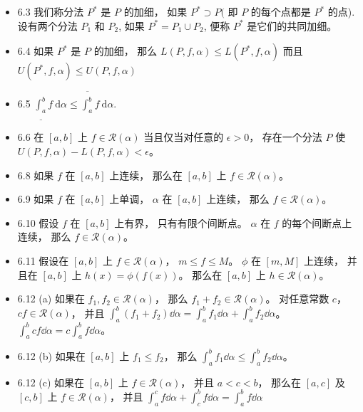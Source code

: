 \begin{itemize}
\item 6.3 我们称分法 $P^{*}$ 是 $P$ 的加细， 如果 $P^{*} \supset P($ 即 $P$ 的每个点都是 $P^{*}$ 的点). 设有两个分法 $P_{1}$ 和 $P_{2}$, 如果 $P^{*}=P_{1} \cup P_{2}$, 便称 $P^{*}$ 是它们的共同加细。

\item 6.4 如果 $P^{*}$ 是 $P$ 的加细， 那么 $L(P, f, \alpha) \leqslant L\left(P^{*}, f, \alpha\right)$ 而且 $U\left(P^{*}, f, \alpha\right) \leqslant U(P, f, \alpha)$

\item 6.5 $\underline{\int_{a}^{b}} f \mathrm{~d} \alpha \leqslant \overline{\int_{a}^{b}} f \mathrm{~d} \alpha .$

\item 6.6 在 $[a,b]$ 上 $f\in\mathscr{R}(\alpha)$ 当且仅当对任意的 $\epsilon>0$， 存在一个分法 $P$ 使 $U(P,f,\alpha)-L(P,f,\alpha)<\epsilon$。

\item 6.8 如果 $f$ 在 $[a,b]$ 上连续， 那么在 $[a,b]$ 上 $f\in \mathscr{R}(\alpha)$。

\item 6.9 如果 $f$ 在 $[a,b]$ 上单调， $\alpha$ 在 $[a,b]$ 上连续， 那么 $f\in \mathscr{R}(\alpha)$。

\item 6.10 假设 $f$ 在 $[a,b]$ 上有界， 只有有限个间断点。 $\alpha$ 在 $f$ 的每个间断点上连续， 那么 $f\in \mathscr{R}(\alpha)$。

\item 6.11 假设在 $[a,b]$ 上 $f\in \mathscr{R}(\alpha)$， $m\leqslant f\leqslant M$。 $\phi$ 在 $[m, M]$ 上连续， 并且在 $[a,b]$ 上 $h(x) = \phi(f(x))$。 那么在 $[a,b]$ 上 $h\in \mathscr{R}(\alpha)$。

\item 6.12 (a) 如果在 $f_1,f_2 \in \mathscr{R}(\alpha)$， 那么 $f_1+f_2 \in \mathscr{R}(\alpha)$。 对任意常数 $c$， $cf\in \mathscr{R}(\alpha)$， 并且 $\int_a^b (f_1+f_2)\dd{\alpha} = \int_a^bf_1\dd{\alpha} + \int_a^bf_2\dd{\alpha}$。 $\int_a^b cf\dd{\alpha} = c\int_a^b f\dd{\alpha}$。

\item  6.12 (b) 如果在 $[a,b]$ 上 $f_1\leqslant f_2$， 那么 $\int_a^bf_1\dd{\alpha} \leqslant \int_a^bf_2\dd{\alpha}$。

\item  6.12 (c) 如果在 $[a,b]$ 上 $f\in \mathscr{R}(\alpha)$， 并且 $a<c< b$， 那么在 $[a,c]$ 及 $[c,b]$ 上 $f\in \mathscr{R}(\alpha)$， 并且 $\int_a^cf\dd{\alpha}+\int_c^bf\dd{\alpha} = \int_a^bf\dd{\alpha}$


\end{itemize}

